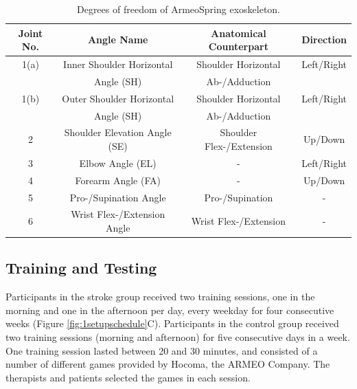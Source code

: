 \begin{table}
	\begin{tabular}{|c|c|c|c|}
		\hline
		Joint No. & Angle Name & Anatomical Counterpart & Direction \\
		\hline
		1(a) & Inner Shoulder Horizontal & Shoulder Horizontal & Left/Right \\
		& Angle (SH)& Ab-/Adduction &\\ \hline
		1(b) & Outer Shoulder Horizontal & Shoulder Horizontal & Left/Right \\
		& Angle (SH)& Ab-/Adduction &\\ \hline
		2 & Shoulder Elevation Angle (SE) & Shoulder Flex-/Extension & Up/Down \\ \hline
		3 & Elbow Angle (EL) & - & Left/Right \\ \hline
		4 & Forearm Angle (FA) & - & Up/Down \\ \hline
		5 & Pro-/Supination Angle & Pro-/Supination & - \\  \hline
		6 & Wrist Flex-/Extension Angle & Wrist Flex-/Extension & - \\
		\hline
	\end{tabular}
	\caption{Degrees of freedom of ArmeoSpring exoskeleton.}
	\label{tab:devicedof}
\end{table}

\subsection{Training and Testing}
Participants in the stroke group received two training sessions, one in the morning and one in the afternoon per day, every weekday for four consecutive weeks (Figure \ref{fig:1setupschedule}C). 
Participants in the control group received two training sessions (morning and afternoon) for five consecutive days in a week. 
One training session lasted between 20 and 30 minutes, and consisted of a number of different games provided by Hocoma, the ARMEO Company.
The therapists and patients selected the games in each session.  

